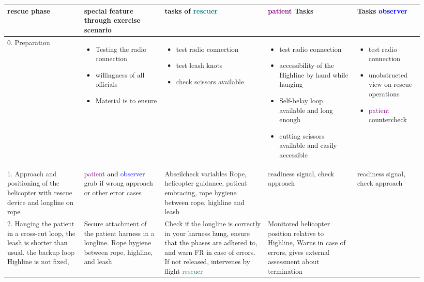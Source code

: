 \documentclass[a4paper,10pt]{scrartcl}
\begin{document}
\begin{landscape}

\begin{longtable}{|p{4cm}|p{4cm}|p{4cm}|p{4cm}|p{4cm}|}
 \hline
 rescue phase & special feature through exercise scenario & tasks of \textcolor{teal}{rescuer} & \textcolor{purple}{patient} Tasks & Tasks \textcolor{blue}{observer} \\ 
 \hline
 \hline 
 0. Preparation & 
 \begin{itemize}
    \item Testing the radio connection
    \item willingness of all officials
    \item Material is to ensure
  \end{itemize} & 
   \begin{itemize}
    \item test radio connection
    \item test leash knots
    \item check scissors available
  \end{itemize} & 
   \begin{itemize}
    \item test radio connection
    \item accessibility of the Highline by hand while hanging
    \item Self-belay loop available and long enough
    \item  cutting scissors available and easily accessible
  \end{itemize} & 
   \begin{itemize}
    \item test radio connection
    \item unobstructed view on rescue operations
    \item \textcolor{purple}{patient} countercheck
  \end{itemize} \\
  \hline
  
 1. Approach and positioning of the helicopter with rescue device and longline on rope & \textcolor{purple}{patient} and \textcolor{blue}{observer} grab if wrong approach or other error cases & Abseilcheck variables Rope, helicopter guidance, patient embracing, rope hygiene between rope, highline and leash & readiness signal, check approach & readiness signal, check approach \\
  \hline
  
 2. Hanging the patient in a cross-cut loop, the leash is shorter than usual, the backup loop Highline is not fixed, & Secure attachment of the patient harness in a longline. Rope hygiene between rope, highline, and leash &  Check if the longline is correctly in your harness hung, ensure that the phases are adhered to, and warn FR in case of errors. If not released, intervenes by flight \textcolor{teal}{rescuer} & Monitored helicopter position relative to Highline, Warns in case of errors, gives external assessment about termination \\
  \hline
  

\end{longtable}
\end{landscape}
\end{document}
